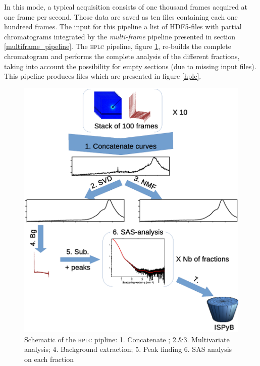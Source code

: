\documentclass[preprint]{iucr}              %
\begin{document}
In this mode, a typical acquisition consists of one thousand frames acquired at one frame per second.
Those data are saved as ten files containing each one hundreed frames.
The input for this pipeline a list of HDF5-files with partial chromatograms integrated by the \textit{multi-frame} pipeline presented in section \ref{multiframe_pipeline}. 
The \textsc{hplc} pipeline, figure \ref{hplc_worflow}, re-builds the complete chromatogram and performs the complete analysis of the different fractions, taking into account the possibility for empty sections (due to missing input files).
This pipeline produces files which are presented in figure \ref{hplc}.
\begin{figure}
\label{hplc_worflow}
\includegraphics*[width=12cm]{HPLC_pipeline.eps}
\caption{Schematic of the \textsc{hplc} pipline: 
1. Concatenate ;
2.\&3. Multivariate analysis;
4. Background extraction;
5. Peak finding
6. SAS analysis on each fraction}
\end{figure}
\end{document}
